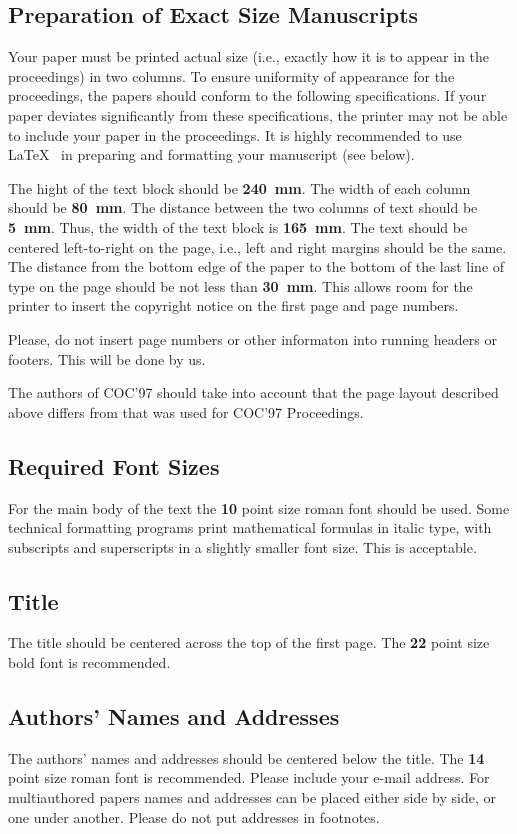 \subsection{Preparation of Exact Size Manuscripts}

Your paper must be printed actual size (i.e., exactly
how it is to appear in the proceedings) in two columns.
To ensure uniformity of appearance for the proceedings,
the papers should conform to the following specifications.
If your paper deviates significantly from these
specifications, the printer may not be able
to include your paper in the proceedings.
It is highly recommended to use \LaTeX~ in preparing and
formatting your manuscript (see below).

The hight of the text block should be {\bf 240~mm}.
The width of each column should be {\bf 80~mm}.
The distance between the two columns of text
should be {\bf 5~mm}. Thus, the width of the text block
is {\bf 165~mm}.
The text should be centered left-to-right
on the page, i.e., left and right margins
should be the same.
The distance from the bottom
edge of the paper to the bottom of the last
line of type on the page should be not less than {\bf 30~mm}.
This allows room for the printer to
insert the copyright notice on the first page
and page numbers.

Please, do not insert page numbers or other informaton into
running headers or footers. This will be done by us.

The authors of COC'97 should take into account that
the page layout described above differs from that was
used for COC'97 Proceedings.

\subsection{Required Font Sizes}

For the main body of the text the {\bf 10} point size roman font
should be used.
Some technical formatting programs print
mathematical formulas in italic type, with subscripts and
superscripts in a slightly smaller font size. This is acceptable.

\subsection{Title} The title should be centered across the top
of the first page. The {\bf 22} point size bold font is recommended.

\subsection{Authors' Names and Addresses} The authors' names and
addresses should be centered below the title. The {\bf 14} point
size roman font is recommended. Please include your e-mail address.
For multiauthored papers names and addresses can be placed
either side by side, or one under another. Please do not
put addresses in footnotes.

